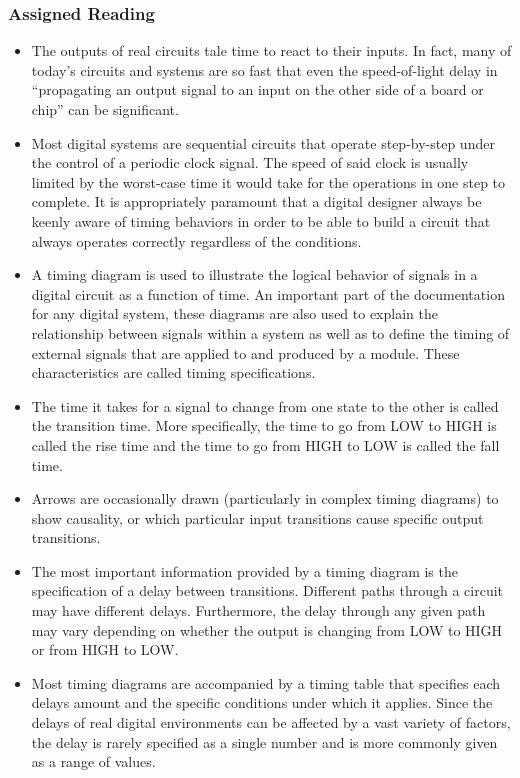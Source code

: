 \documentclass[10pt,a4paper]{article}
\begin{document}
\subsubsection{Assigned Reading}
\begin{itemize}
\item The outputs of real circuits tale time to react to their inputs. In fact, many of today's circuits and systems are so fast that even the speed-of-light delay in ``propagating an output signal to an input on the other side of a board or chip'' can be significant.
\item Most digital systems are sequential circuits that operate step-by-step under the control of a periodic clock signal. The speed of said clock is usually limited by the worst-case time it would take for the operations in one step to complete. It is appropriately paramount that a digital designer always be keenly aware of timing behaviors in order to be able to build a circuit that always operates correctly regardless of the conditions.
\item A timing diagram is used to illustrate the logical behavior of signals in a digital circuit as a function of time. An important part of the documentation for any digital system, these diagrams are also used to explain the relationship between signals within a system as well as to define the timing of external signals that are applied to and produced by a module. These characteristics are called timing specifications. 
\item The time it takes for a signal to change from one state to the other is called the transition time. More specifically, the time to go from LOW to HIGH is called the rise time and the time to go from HIGH to LOW is called the fall time. 
\item Arrows are occasionally drawn (particularly in complex timing diagrams) to show causality, or which particular input transitions cause specific output transitions. 
\item The most important information provided by a timing diagram is the specification of a delay between transitions. Different paths through a circuit may have different delays. Furthermore, the delay through any given path may vary depending on whether the output is changing from LOW to HIGH or from HIGH to LOW. 
\item Most timing diagrams are accompanied by a timing table that specifies each delays amount and the specific conditions under which it applies. Since the delays of real digital environments can be affected by a vast variety of factors, the delay is rarely specified as a single number and is more commonly given as a range of values. 

\end{itemize}
\end{document}
